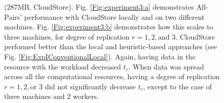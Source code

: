 \documentclass{rspublic}
\newcommand{\fixme}[1]{ { \bf{ ***FIXME: #1
}} } \newcommand{\jhanote}[1]{ {\textcolor{red} { ***Jha: #1 }}}
\newcommand{\micnote}[1]{ {\textcolor{blue} { ***Michael: #1 }}}
\newcommand{\betynote}[1]{ {\textcolor{orange} { ***Bety: #1 }}}
\newcommand{\jhanote}[1]{} \newcommand{\micnote}[1]{}\newcommand{\betynote}[1]{} \newcommand{\fixme}[1]{}
\begin{document}
\begin{figure}
\begin{center}
\caption{(287MB,  CloudStore).
Fig. \ref{Fig:experiment3:a} demonstrates All-Pairs' performance
with CloudStore locally and on two different machines. Fig. \ref{Fig:experiment3:b} demonstrates how this scales to three machines, for degree of
replication $r=1,2,\mbox{and } 3$. CloudStore performed better than the
local and heuristic-based approaches (see Fig.
\ref{Fig:ExpIConventionalLocal}). Again,
having data in the resource with the workload decreased $t_c$. When data
was spread across all the computational resources, having a degree of
replication $r = 1, 2, \mbox{or } 3$ did not significantly decrease
$t_c$, except to the case of three machines and 2 workers.}
\label{Fig:experiment3}
\end{center}
\vspace{-0.3cm}
\end{figure}
\end{document}
